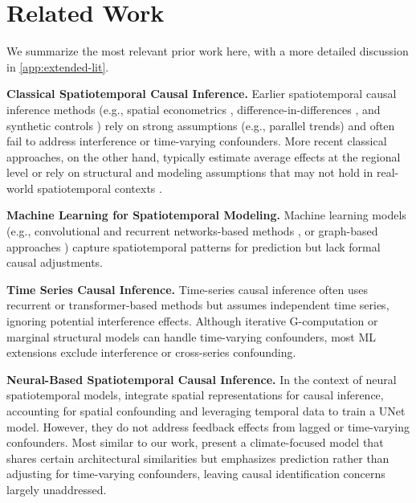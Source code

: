 \section{Related Work}
\label{sec:lit-review}

We summarize the most relevant prior work here, with a more detailed discussion in \cref{app:extended-lit}.

\textbf{Classical Spatiotemporal Causal Inference.} Earlier spatiotemporal causal inference methods (e.g., spatial econometrics \citep{anselin2013spatial}, difference-in-differences \citep{keele2015geographic}, and synthetic controls \citep{ben2022synthetic}) rely on strong assumptions (e.g., parallel trends) and often fail to address interference or time-varying confounders. More recent classical approaches, on the other hand, typically estimate average effects at the regional level or rely on structural and modeling assumptions that may not hold in real-world spatiotemporal contexts \citep{wang2021causal, christiansen2022toward, papadogeorgou2022causal, zhang2023spatiotemporal, zhou2024estimating}.

\textbf{Machine Learning for Spatiotemporal Modeling.} Machine learning models (e.g., convolutional and recurrent networks-based methods \citep{shi2015convolutional, zhang2017deep}, or graph-based approaches \citep{li2017diffusion, wu2019graph}) capture spatiotemporal patterns for prediction but lack formal causal adjustments.

\textbf{Time Series Causal Inference.} Time-series causal inference often uses recurrent or transformer-based methods \citep{bica2020estimating, seedat2022continuous, melnychuk2022causal} but assumes independent time series, ignoring potential interference effects. Although iterative G-computation \citep{bang2005doubly, robins2008estimation} or marginal structural models \citep{robins2000marginal} can handle time-varying confounders, most ML extensions \citep{lim2018forecasting, li2021g, hess2024g} exclude interference or cross-series confounding.

\textbf{Neural-Based Spatiotemporal Causal Inference.} In the context of neural spatiotemporal models, \citet{tec2023weather2vec} integrate spatial representations for causal inference, accounting for spatial confounding and leveraging temporal data to train a UNet model. However, they do not address feedback effects from lagged or time-varying confounders. Most similar to our work, \citet{ali2024estimating} present a climate-focused model that shares certain architectural similarities but emphasizes prediction rather than adjusting for time-varying confounders, leaving causal identification concerns largely unaddressed. 

